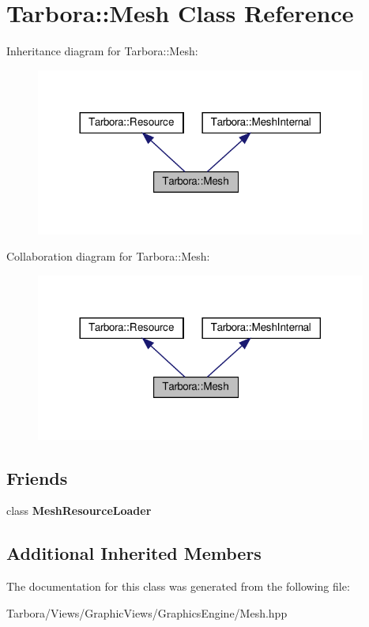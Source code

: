 \hypertarget{classTarbora_1_1Mesh}{}\section{Tarbora\+:\+:Mesh Class Reference}
\label{classTarbora_1_1Mesh}


Inheritance diagram for Tarbora\+:\+:Mesh\+:
\nopagebreak
\begin{figure}[H]
\begin{center}
\leavevmode
\includegraphics[width=308pt]{classTarbora_1_1Mesh__inherit__graph}
\end{center}
\end{figure}


Collaboration diagram for Tarbora\+:\+:Mesh\+:
\nopagebreak
\begin{figure}[H]
\begin{center}
\leavevmode
\includegraphics[width=308pt]{classTarbora_1_1Mesh__coll__graph}
\end{center}
\end{figure}
\subsection*{Friends}
\begin{DoxyCompactItemize}
\item 
\mbox{\label{classTarbora_1_1Mesh_a27c9226be711b1d4d1e81ab76c541bf2}} 
class {\bfseries Mesh\+Resource\+Loader}
\end{DoxyCompactItemize}
\subsection*{Additional Inherited Members}


The documentation for this class was generated from the following file\+:\begin{DoxyCompactItemize}
\item 
Tarbora/\+Views/\+Graphic\+Views/\+Graphics\+Engine/Mesh.\+hpp\end{DoxyCompactItemize}
